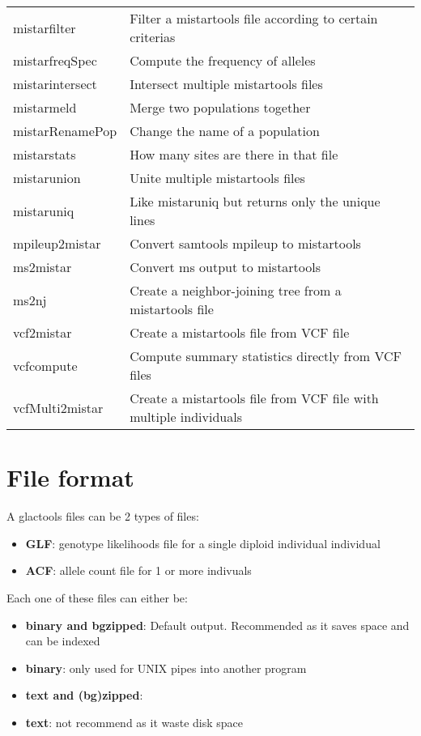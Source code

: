 \documentclass[a4paper]{article}
\begin{document}
\begin{tabular}{|l|l|}
mistarfilter & Filter a mistartools file according to certain criterias \\
mistarfreqSpec & Compute the frequency of alleles \\
mistarintersect & Intersect multiple mistartools files \\
mistarmeld & Merge two populations together \\
mistarRenamePop & Change the name of a population \\
mistarstats & How many sites are there in that file \\
mistarunion & Unite multiple mistartools files \\
mistaruniq & Like mistaruniq but returns only the unique lines \\
mpileup2mistar & Convert samtools mpileup to mistartools \\
ms2mistar & Convert ms output to mistartools \\
ms2nj & Create a neighbor-joining tree from a mistartools file \\
vcf2mistar & Create a mistartools file from VCF file \\
vcfcompute & Compute summary statistics directly from VCF files \\
vcfMulti2mistar & Create a mistartools file from VCF file with multiple individuals \\
\hline
\end{tabular}

\section{File format}


\noindent  A glactools files can be 2 types of files:
\begin{itemize}
\item {\bf GLF}: genotype likelihoods file for a single diploid individual individual
\item {\bf ACF}: allele count file for 1 or more indivuals
\end{itemize}

\noindent  Each one of these files can either be:
\begin{itemize}
\item {\bf binary and bgzipped}: Default output. Recommended as it saves space and can be indexed
\item {\bf binary}:  only used for UNIX pipes into another program
\item {\bf text and (bg)zipped}: 
\item {\bf text}: not recommend as it waste disk space
\end{itemize}
\end{document}
